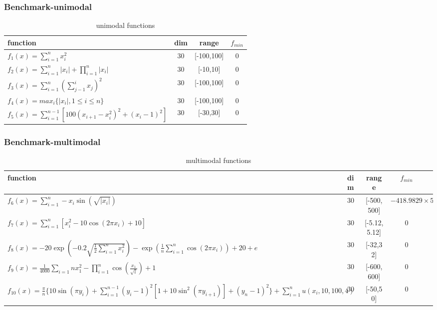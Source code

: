 \begin{frame}
	\frametitle{Benchmark-unimodal}
	\begin{table}[]
	\centering
	\caption{unimodal functions}
	\label{wolf_table1}
	\begin{tabular}{lccc}
	\hline
	function & dim & range & $f_{min}$ \\ \hline \hline
	$f_1(x)=\sum_{i=1}^{n}x_i^2$ & 30 &  [-100,100]  & 0  \\ \hline
	$f_2(x)=\sum_{i=1}^{n}|x_i|+\prod_{i=1}^{n}|x_i|$ & 30 & [-10,10] & 0 \\ \hline
	$f_3(x)=\sum_{i=1}^{n}(\sum_{j-1}^{i} x_j)^2$ & 30  & [-100,100] &  0 \\ \hline
	$f_4(x)=max_i\{|x_i|,1 \leq i\leq n\}$ & 30 & [-100,100] &  0 \\ \hline
	$f_5(x)=\sum_{i=1}^{n-1}[100(x_{i+1}-x_i^2)^2+(x_i-1)^2]$ & 30 & [-30,30] &  0 \\ \hline
	\end{tabular}
	\end{table}
\end{frame}


\begin{frame}
	\frametitle{Benchmark-multimodal}
	\begin{table}[]
	\centering
	\caption{multimodal functions}
	\label{wolf_table2}
	\begin{tabular}{p{8cm}lccc}  
	\hline
	function & dim & range & $f_{min}$ \\ \hline \hline
	$f_6(x)=\sum_{i=1}^{n} -x_i \sin (\sqrt{|x_i|})$ & 30 &  [-500,500]  & $-418.9829 \times 5$ \\ \hline
	$f_7(x)=\sum_{i=1}^{n}[x_i^2-10\cos (2 \pi x_i)+10]$ & 30 & [-5.12,5.12] & 0 \\ \hline
	$f_8(x)=-20\exp{\left(-0.2\sqrt{\frac{1}{2}\sum_{i=1}^{n}x_i^2}\right)}- \exp{\left(\frac{1}{n}\sum_{i=1}^{n}\cos(2\pi x_i)\right)+20+e}$ & 30  & [-32,32] &  0 \\ \hline
	$f_9(x)=\frac{1}{4000}\sum_{i=1}{n}x_1^2-\prod_{i=1}^{n}\cos\left(\frac{x_1}{\sqrt{i}} \right)+1 $ & 30 & [-600,600] &  0 \\ \hline
	$f_{10}(x)=\frac{\pi}{n}\{10\sin(\pi y_i)+\sum_{i=1}^{n-1}(y_i-1)^2  [1+10{\sin}^2(\pi y_{i+1})]+(y_n-1)^2\}+\sum_{i=1}^{n}u(x_i,10,100,4) $ & 30 & [-50,50] &  0 \\ \hline
	\end{tabular}
	\end{table}
\end{frame}

